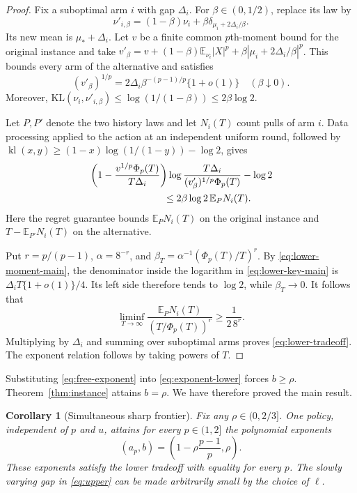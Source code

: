 \documentclass[twoside]{article}
\newtheorem{corollary}[theorem]{Corollary}
\newcommand{\E}{\mathbb E}
\begin{document}
\begin{proof}
Fix a suboptimal arm $i$ with gap $\Delta_i$. For $\beta\in(0,1/2)$, replace
its law by
\begin{equation}
 \nu'_{i,\beta}=(1-\beta)\nu_i+
 \beta\delta_{\mu_i+2\Delta_i/\beta}.
 \label{eq:lower-alternative-main}
\end{equation}
Its new mean is $\mu_*+\Delta_i$. Let $v$ be a finite common $p$th-moment
bound for the original instance and take
$v'_\beta=v+(1-\beta)\E_{\nu_i}|X|^p+
\beta|\mu_i+2\Delta_i/\beta|^p$. This bounds every arm of the alternative and
satisfies
\begin{equation}
 (v'_\beta)^{1/p}
 =2\Delta_i\beta^{-(p-1)/p}\{1+o(1)\}
 \quad(\beta\downarrow0).
 \label{eq:lower-moment-main}
\end{equation}
Moreover,
$\mathrm{KL}(\nu_i,\nu'_{i,\beta})\leq\log(1/(1-\beta))
\leq2\beta\log2$.

Let $P,P'$ denote the two history laws and let $N_i(T)$ count pulls of arm
$i$. Data processing applied to the action at an independent uniform round,
followed by
$\operatorname{kl}(x,y)\geq(1-x)\log(1/(1-y))-\log2$, gives
\begin{align}
 &\left(1-\frac{v^{1/p}\Phi_p(T)}{T\Delta_i}\right)
 \log\frac{T\Delta_i}{(v'_\beta)^{1/p}\Phi_p(T)}-\log2
 \nonumber\\
 &\hspace{27mm}\leq2\beta\log2\,\E_PN_i(T).
 \label{eq:lower-key-main}
\end{align}
Here the regret guarantee bounds $\E_PN_i(T)$ on the original instance and
$T-\E_{P'}N_i(T)$ on the alternative.

Put $r=p/(p-1)$, $\alpha=8^{-r}$, and
$\beta_T=\alpha^{-1}(\Phi_p(T)/T)^r$. By \eqref{eq:lower-moment-main}, the
denominator inside the logarithm in \eqref{eq:lower-key-main} is
$\Delta_iT\{1+o(1)\}/4$. Its left side therefore tends to $\log2$, while
$\beta_T\to0$. It follows that
\[
 \liminf_{T\to\infty}
 \frac{\E_PN_i(T)}{(T/\Phi_p(T))^r}
 \geq\frac1{2\,8^r}.
\]
Multiplying by $\Delta_i$ and summing over suboptimal arms proves
\eqref{eq:lower-tradeoff}. The exponent relation follows by taking powers of
$T$.
\end{proof}

Substituting \eqref{eq:free-exponent} into
\eqref{eq:exponent-lower} forces $b\geq\rho$. Theorem~\ref{thm:instance}
attains $b=\rho$. We have therefore proved the main result.

\begin{corollary}[Simultaneous sharp frontier]
\label{cor:frontier}
Fix any $\rho\in(0,2/3]$. One policy, independent of $p$ and $u$, attains
for every $p\in(1,2]$ the polynomial exponents
\[
 (a_p,b)=\left(1-\rho\frac{p-1}{p},\rho\right).
\]
These exponents satisfy the lower tradeoff with equality for every $p$.
The slowly varying gap in \eqref{eq:upper} can be made arbitrarily small by
the choice of $\ell$.
\end{corollary}
\end{document}
